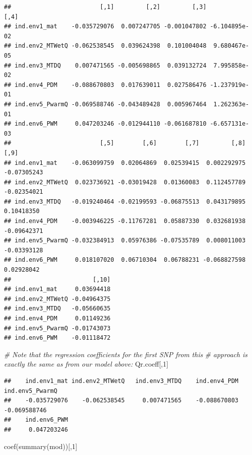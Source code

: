 \documentclass[
]{article}
\newenvironment{Shaded}{\begin{snugshade}}{\end{snugshade}}
\newcommand{\CommentTok}[1]{\textcolor[rgb]{0.56,0.35,0.01}{\textit{#1}}}
\newcommand{\DecValTok}[1]{\textcolor[rgb]{0.00,0.00,0.81}{#1}}
\newcommand{\FunctionTok}[1]{\textcolor[rgb]{0.00,0.00,0.00}{#1}}
\newcommand{\NormalTok}[1]{#1}
\begin{document}
\begin{verbatim}
##                         [,1]         [,2]         [,3]          [,4]
## ind.env1_mat    -0.035729076  0.007247705 -0.001047802 -6.104895e-02
## ind.env2_MTWetQ -0.062538545  0.039624398  0.101004048  9.680467e-05
## ind.env3_MTDQ    0.007471565 -0.005698865  0.039132724  7.995858e-02
## ind.env4_PDM    -0.088670803  0.017639011  0.027586476 -1.237919e-01
## ind.env5_PwarmQ -0.069588746 -0.043489428  0.005967464  1.262363e-01
## ind.env6_PWM     0.047203246 -0.012944110 -0.061687810 -6.657131e-03
##                         [,5]        [,6]        [,7]         [,8]        [,9]
## ind.env1_mat    -0.063099759  0.02064869  0.02539415  0.002292975 -0.07305243
## ind.env2_MTWetQ  0.023736921 -0.03019428  0.01360083  0.112457789 -0.02354021
## ind.env3_MTDQ   -0.019240464 -0.02199593 -0.06875513  0.043179895  0.10418350
## ind.env4_PDM    -0.003946225 -0.11767281  0.05887330  0.032681938 -0.09642371
## ind.env5_PwarmQ -0.032384913  0.05976386 -0.07535789  0.008011003 -0.03393128
## ind.env6_PWM     0.018107020  0.06710304  0.06788231 -0.068827598  0.02928042
##                       [,10]
## ind.env1_mat     0.03694418
## ind.env2_MTWetQ -0.04964375
## ind.env3_MTDQ   -0.05660635
## ind.env4_PDM     0.01149236
## ind.env5_PwarmQ -0.01743073
## ind.env6_PWM    -0.01118472
\end{verbatim}

\begin{Shaded}
\begin{Highlighting}[]
\CommentTok{\# Note that the regression coefficients for the first SNP from this }
\CommentTok{\# approach is exactly the same as from our model above:}
\NormalTok{ Qr.coeff[,}\DecValTok{1}\NormalTok{]}
\end{Highlighting}
\end{Shaded}

\begin{verbatim}
##    ind.env1_mat ind.env2_MTWetQ   ind.env3_MTDQ    ind.env4_PDM ind.env5_PwarmQ 
##    -0.035729076    -0.062538545     0.007471565    -0.088670803    -0.069588746 
##    ind.env6_PWM 
##     0.047203246
\end{verbatim}

\begin{Shaded}
\begin{Highlighting}[]
 \FunctionTok{coef}\NormalTok{(}\FunctionTok{summary}\NormalTok{(mod))[,}\DecValTok{1}\NormalTok{]}
\end{Highlighting}
\end{Shaded}
\end{document}
